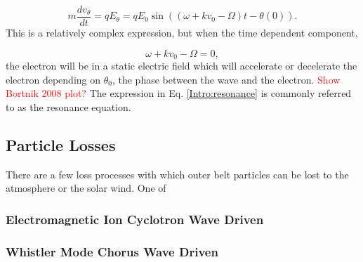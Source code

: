 \begin{equation}
m \frac{dv_\theta}{dt} = qE_\theta = qE_0 \sin{((\omega + kv_0 - \Omega)t - \theta(0))}.
\end{equation} This is a relatively complex expression, but when the time dependent component, 

\begin{equation} \label{Intro:resonance}
\omega + kv_0 - \Omega = 0,
\end{equation} the electron will be in a static electric field which will accelerate or decelerate the electron depending on $\theta_0$, the phase between the wave and the electron. \textcolor{red}{Show Bortnik 2008 plot?} The expression in Eq. \ref{Intro:resonance} is commonly referred to as the resonance equation.


\subsection{Particle Losses}\label{Intro:acceleration}
There are a few loss processes with which outer belt particles can be lost to the atmosphere or the solar wind. One of

\iffalse
few possible loss processes are radial diffusion (Shprits & Thorne, 2004), magnetopause shad-
owing (Ukhorskiy et al., 2006), and pitch angle and energy diffusion due to scattering of electrons by plasma
waves (e.g., Abel & Thorne, 1998; Horne & Thorne, 2003; Meredith et al., 2002; Mozer et al., 2018; Selesnick
et al., 2003; Summers et al., 1998; Thorne et al., 2005). There are a variety of waves that cause pitch angle scat-
tering, including electromagnetic ion cyclotron waves, plasmaspheric hiss, and chorus (Millan & Thorne, 2007;
Thorne, 2010). Chorus predominantly occurs in the dawn sector (6–12 magnetic local times, MLT; Li et al.,
2009) where it accelerates electrons with large equatorial pitch angles and scatters electrons with small equa-
torial pitch angles (Horne & Thorne, 2003). Some of these electrons may be impulsively scattered into the loss
cone, where they result in short-duration ( ∼ 100 ms) enhancements in precipitating flux called microbursts.
\fi

\subsubsection{Electromagnetic Ion Cyclotron Wave Driven}\label{Intro:emic_scattering}

\subsubsection{Whistler Mode Chorus Wave Driven}\label{Intro:chorus_scattering}

